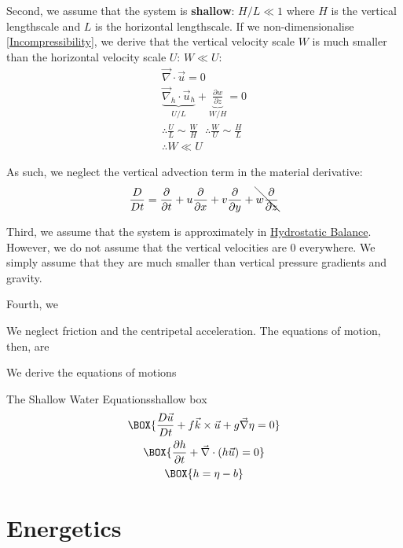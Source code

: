 Second, we assume that the system is \textbf{shallow}: $H/L\ll 1$ where $H$ is the vertical lengthscale and $L$ is the horizontal lengthscale. If we non-dimensionalise \ref{Incompressibility}, we derive that the vertical velocity scale $W$ is much smaller than the horizontal velocity scale $U$: $W\ll U$:
\begin{align*}
    \vec{\nabla}\cdot\vec{u}=0\\
    \underbrace{\vec{\nabla}_h\cdot\vec{u}_h}_{U/L}+\underbrace{\frac{\partial w}{\partial z}}_{W/H}=0\\
    \therefore \frac{U}{L}\sim\frac{W}{H}\text{   }\therefore
    \frac{W}{U}\sim\frac{H}{L}\\
    \therefore \boxed{W \ll U}
\end{align*}

\noindent As such, we neglect the vertical advection term in the material derivative:
\begin{align*}
    \frac{D}{Dt}=\frac{\partial}{\partial t}+u\frac{\partial}{\partial x}
    +v\frac{\partial}{\partial y}+\bcancel{w\frac{\partial}{\partial z}}
\end{align*}

Third, we assume that the system is approximately in \hyperref[Hydrostatic GFD]{Hydrostatic Balance}. However, we do not assume that the vertical velocities are $0$ everywhere. We simply assume that they are much smaller than vertical pressure gradients and gravity.

Fourth, we 

We neglect friction and the centripetal acceleration. The equations of motion, then, are 

We derive the equations of motions
\begin{fact}{The Shallow Water Equations}{shallow box}\label{shallow box}
    \begin{gather}
        \label{SW mom}
        \BOX{\frac{D\vec{u}}{Dt}+f\vec{k}\times\vec{u}+g\vec{\nabla}\eta=0}\\
        \label{SW mass}
        \BOX{\frac{\partial h}{\partial t}+\vec{\nabla}\cdot(h\vec{u})=0}\\
        \label{SW height}
        \BOX{h=\eta-b}
    \end{gather}
\end{fact}


\section{Energetics}



